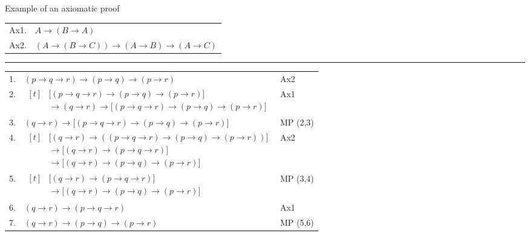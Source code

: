 \documentclass{beamer}
\begin{document}
\begin{frame}{Example of an axiomatic proof}
\begin{tabular}{@{\small}r@{ \small}l}
Ax1.& $A\to(B\to A)$ \\
Ax2.& $(A\to (B\to C)) \to (A\to B) \to (A\to C)$
\end{tabular}


\hrule


\begin{tabular}{@{\small}r@{ \small}l@{ \small}l}
1.& $(p\to q\to r) \to  (p\to q) \to  (p\to r)$ & Ax2 \\
2.& $\begin{aligned}[t]
    &\big[(p\to q\to r)\to(p\to q)\to(p\to r)\big]\\
    &\to (q\to r) \to \big[(p\to q\to r)\to(p\to q)\to(p\to r)\big]
    \end{aligned}$
    & Ax1 \\
3.& $(q\to r)\to \big[(p\to q\to r)\to(p\to q)\to(p\to r)\big]$
    & MP (2,3) \\
4.& $\begin{aligned}[t]
    &\big[(q\to r)\to ((p\to q\to r)\to(p\to q)\to(p\to r))\big] \\
    &\to \big[(q\to r)\to (p\to q\to r)\big] \\
    &\to \big[(q\to r)\to (p\to q)\to (p\to r)\big]
    \end{aligned}$
    & Ax2 \\
5.& $\begin{aligned}[t]
    &\big[(q\to r)\to (p\to q\to r)\big] \\
    &\to \big[(q\to r)\to (p\to q)\to (p\to r)\big]
    \end{aligned}$
    & MP (3,4) \\
6.& $(q\to r)\to (p\to q\to r)$ & Ax1 \\
7.& $(q\to r)\to (p\to q)\to (p\to r)$
    & MP (5,6)
\end{tabular}
\end{frame}
\end{document}
